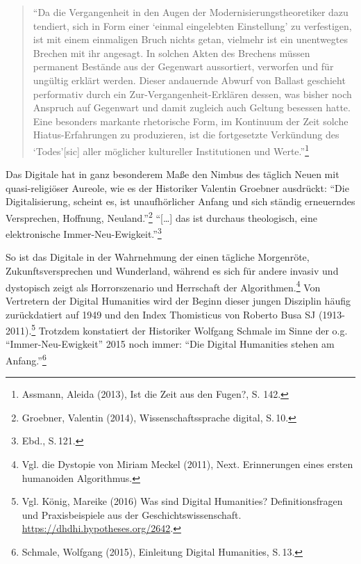 \documentclass[a4paper,
fontsize=11pt,
oneside,
numbers=noperiodatend,
parskip=half-,
bibliography=totoc,
final
]{scrartcl}
\begin{document}
\begin{quote}
\enquote{Da die Vergangenheit in den Augen der
Modernisierungstheoretiker dazu tendiert, sich in Form einer
\enquote{einmal eingelebten Einstellung} zu verfestigen, ist mit einem
einmaligen Bruch nichts getan, vielmehr ist ein unentwegtes Brechen mit
ihr angesagt. In solchen Akten des Brechens müssen permanent Bestände
aus der Gegenwart aussortiert, verworfen und für ungültig erklärt
werden. Dieser andauernde Abwurf von Ballast geschieht performativ durch
ein Zur-Vergangenheit-Erklären dessen, was bisher noch Anspruch auf
Gegenwart und damit zugleich auch Geltung besessen hatte. Eine besonders
markante rhetorische Form, im Kontinuum der Zeit solche
Hiatus-Erfahrungen zu produzieren, ist die fortgesetzte Verkündung des
\enquote{Todes}{[}sic{]} aller möglicher kultureller Institutionen und
Werte.}\footnote{Assmann, Aleida (2013), Ist die Zeit aus den Fugen?, S.
  142.}
\end{quote}

Das Digitale hat in ganz besonderem Maße den Nimbus des täglich Neuen
mit quasi-religiöser Aureole, wie es der Historiker Valentin Groebner
ausdrückt: \enquote{Die Digitalisierung, scheint es, ist unaufhörlicher
Anfang und sich ständig erneuerndes Versprechen, Hoffnung,
Neuland.}\footnote{Groebner, Valentin (2014), Wissenschaftssprache
  digital, S.\,10.} \enquote{{[}\ldots{}{]} das ist durchaus theologisch,
eine elektronische Immer-Neu-Ewigkeit.}\footnote{Ebd., S.\,121.}

So ist das Digitale in der Wahrnehmung der einen tägliche Morgenröte,
Zukunftsversprechen und Wunderland, während es sich für andere invasiv
und dystopisch zeigt als Horrorszenario und Herrschaft der
Algorithmen.\footnote{Vgl. die Dystopie von Miriam Meckel (2011), Next.
  Erinnerungen eines ersten humanoiden Algorithmus.} Von Vertretern der
Digital Humanities wird der Beginn dieser jungen Disziplin häufig
zurückdatiert auf 1949 und den Index Thomisticus von Roberto Busa SJ
(1913-2011).\footnote{Vgl. König, Mareike (2016) Was sind Digital
  Humanities? Definitionsfragen und Praxisbeispiele aus der
  Geschichtswissenschaft. \url{https://dhdhi.hypotheses.org/2642}.}
Trotzdem konstatiert der Historiker Wolfgang Schmale im Sinne der o.g.
\enquote{Immer-Neu-Ewigkeit} 2015 noch immer: \enquote{Die Digital
Humanities stehen am Anfang.}\footnote{Schmale, Wolfgang (2015),
  Einleitung Digital Humanities, S.\,13.}
\end{document}
